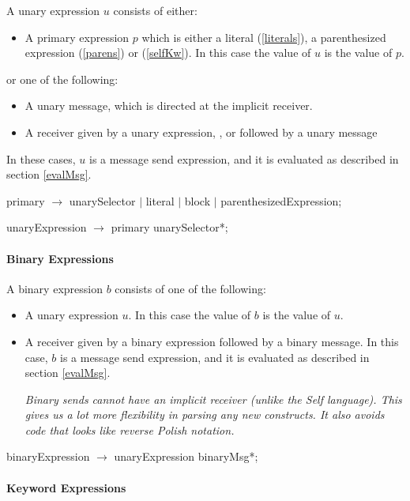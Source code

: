\documentclass{article}
\begin{document}
A unary expression $u$ consists of either:
\begin{itemize}
\item A primary expression $p$ which is either a literal (\ref{literals}), a parenthesized expression (\ref{parens}) or \SELF{} (\ref{selfKw}). In this case  the value of $u$ is the value of $p$.
\end{itemize}
or one of the following:
\begin{itemize}
\item A unary message,  which is directed at the implicit receiver.
\item A receiver given by a unary expression, \OUTER{}, or \SUPER{} followed by a unary message
\end{itemize}
In these cases, $u$ is a message send expression, and it is evaluated as described in section \ref{evalMsg}.
\begin{newspeak}
primary $\rightarrow$  unarySelector $|$
               literal $|$
               block $|$ 
               parenthesizedExpression;
 
unaryExpression $\rightarrow$ primary unarySelector*;
\end{newspeak}


\paragraph{Binary Expressions}
\label{binary}

A binary expression $b$ consists of one of the following:
\begin{itemize}
\item A  unary expression $u$. In this case  the value of $b$ is the value of $u$.
\item A receiver given by a binary expression followed by a binary message. In this case, $b$ is a message send expression, and it is evaluated as described in section \ref{evalMsg}.

{\it
Binary sends cannot have an implicit receiver (unlike the Self language).  This gives us a lot more flexibility in parsing any new constructs. It also avoids code that looks like reverse Polish notation.
}

\end{itemize}
\begin{newspeak}
binaryExpression $\rightarrow$  unaryExpression binaryMsg*;
\end{newspeak}


\paragraph{Keyword Expressions}
\label{keyword}
\end{document}
